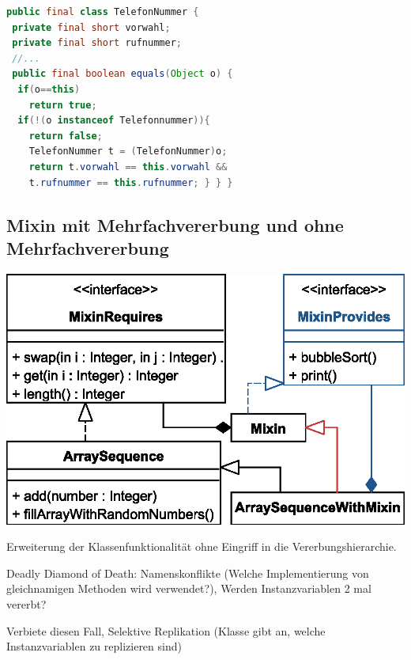 \documentclass[a4paper,fontsize=9pt, DIV=calc]{scrartcl}
\begin{document}
\begin{multicols}{2}
\begin{minipage}{0.65\columnwidth}
\begin{lstlisting}[style=siemens, language=Java]
public final class TelefonNummer {
 private final short vorwahl;
 private final short rufnummer;
 //...
 public final boolean equals(Object o) {
  if(o==this)
    return true;
  if(!(o instanceof Telefonnummer)){
    return false;
    TelefonNummer t = (TelefonNummer)o;
    return t.vorwahl == this.vorwahl && 
    t.rufnummer == this.rufnummer; } } }
\end{lstlisting}
\end{minipage}\hfill%
\begin{minipage}[c][4cm]{0.3\columnwidth}
\end{minipage}

\subsection[Mixin]{Mixin \hfill \small \textcolor{siemensred}{mit Mehrfachvererbung} und \textcolor{siemensblue}{ohne Mehrfachvererbung}}

\begin{center}
\includegraphics[width=0.85\columnwidth]{src/mixin}
\end{center}

\begin{description}[leftmargin=*]\itemsep-2mm
\item[Nutzen] Erweiterung der Klassenfunktionalität ohne Eingriff in die Vererbungshierarchie.
\item[\textcolor{siemensred}{Probleme}] Deadly Diamond of Death: Namenskonflikte (Welche Implementierung von gleichnamigen Methoden wird verwendet?), Werden Instanzvariablen 2 mal vererbt?
\item[Lösungsansatz] Verbiete diesen Fall, Selektive Replikation (Klasse gibt an, welche Instanzvariablen zu replizieren sind)
\end{description}


\end{multicols}
\end{document}
